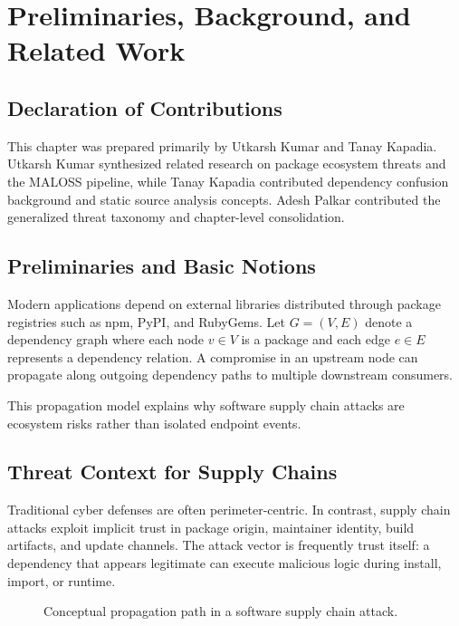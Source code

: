 \chapter{Preliminaries, Background, and Related Work}
\label{ch:background}

\section*{Declaration of Contributions}
This chapter was prepared primarily by Utkarsh Kumar and Tanay Kapadia.
Utkarsh Kumar synthesized related research on package ecosystem threats and the MALOSS pipeline,
while Tanay Kapadia contributed dependency confusion background and static source analysis concepts.
Adesh Palkar contributed the generalized threat taxonomy and chapter-level consolidation.

\section{Preliminaries and Basic Notions}

Modern applications depend on external libraries distributed through package registries such as
npm, PyPI, and RubyGems. Let $G=(V,E)$ denote a dependency graph where each node
$v \in V$ is a package and each edge $e \in E$ represents a dependency relation.
A compromise in an upstream node can propagate along outgoing dependency paths to multiple
downstream consumers.

This propagation model explains why software supply chain attacks are ecosystem risks rather than
isolated endpoint events.

\section{Threat Context for Supply Chains}

Traditional cyber defenses are often perimeter-centric. In contrast, supply chain attacks exploit
implicit trust in package origin, maintainer identity, build artifacts, and update channels.
The attack vector is frequently trust itself: a dependency that appears legitimate can execute
malicious logic during install, import, or runtime.

\begin{figure}[htbp]
\centering
{}
\caption{Conceptual propagation path in a software supply chain attack.}
\label{fig:supply-chain-path}
\end{figure}

